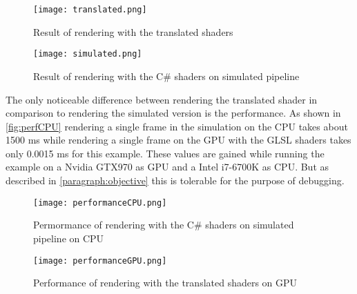 \begin{figure}[h!]
    \centering
    \begin{minipage}{0.48\textwidth}
        \centering
        \texttt{[image: translated.png]} %
        \caption[Screenshot of example scene rendered with translated shaders]{Result of rendering with the translated shaders}
        \label{fig:translated}
    \end{minipage}\hfill
    \begin{minipage}{0.48\textwidth}
        \centering
        \texttt{[image: simulated.png]} %
        \caption[Screenshot of example scene rendered with C\# shaders on simulated pipeline]{Result of rendering with the C\# shaders on simulated pipeline}
        \label{fig:simulated}
    \end{minipage}
\end{figure}

The only noticeable difference between rendering the translated shader in comparison to rendering the simulated version is the performance. As shown in \autoref{fig:perfCPU} rendering a single frame in the simulation on the CPU takes about 1500 ms while rendering a single frame on the GPU with the GLSL shaders takes only 0.0015 ms for this example. These values are gained while running the example on a Nvidia GTX970 as GPU and a Intel i7-6700K as CPU. But as described in \autoref{paragraph:objective} this is tolerable for the purpose of debugging.

\begin{figure}[h!]
    \centering
    \begin{minipage}{0.58\textwidth}
        \centering
        \texttt{[image: performanceCPU.png]} %
        \caption[Screenshot of console output rendering the example with C\# shaders on simulated pipeline]{Permormance of rendering with the C\# shaders on simulated pipeline on CPU}
                \label{fig:perfCPU}
    \end{minipage}\hfill
    \begin{minipage}{0.38\textwidth}
        \centering
        \texttt{[image: performanceGPU.png]} %
        \caption[Screenshot of console output rendering the example with translated shaders]{Performance of rendering with the translated shaders on GPU}
        \label{fig:perfGPU}
    \end{minipage}
\end{figure}

